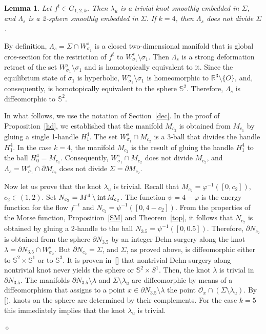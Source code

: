 \documentclass[%
 aip,
 amsmath,amssymb,
preprint,%
]{revtex4-1}
\newtheorem{lemma}{Lemma}[section]
\newenvironment{proof}{{\bf Proof:}}
{\hfill $\diamond$\medskip}
\begin{document}
\begin{lemma}\label{seq1} Let $f^t\in G_{1,2,k}$. Then $\lambda_u$ is a trivial knot smoothly embedded in $\Sigma$, and $\Lambda_s$ is a 2-sphere smoothly embedded in $\Sigma$. If $k=4$, then $\Lambda_s$ does not divide $\Sigma$.
\end{lemma}
\begin{proof} By definition, $\Lambda_s=\Sigma\cap W^s_{\sigma_1}$ is a closed two-dimensional manifold that is global cros-section for the restriction of $f^t$ to $W^s_{\sigma_1}\setminus \sigma_1$. Then  $\Lambda_s$ is a strong deformation retract of the set $W^s_{\sigma_1}\setminus \sigma_1$ and is homotopically  equivalent to it. Since the equilibrium state of $\sigma_1$ is hyperbolic, $W^s_{\sigma_1}\setminus \sigma_1$ is homeomorphic to $\mathbb R^3\setminus \{O\}$, and, consequently,  is homotopically equivalent to the sphere $\mathbb S^2$. Therefore, $\Lambda_s$ is diffeomorphic to $\mathbb S^2$.

In what follows, we use the notation of Section~\ref{dec}. In the proof of Proposition~\ref{hd}, we established that the manifold $M_{c_2}$ is obtained from $M_{c_1}$ by gluing a single 1-handle $H^4_1$. The set $W^s_{\sigma_1}\cap M_{c_2}$ is a 3-ball that divides the handle $H^4_1$. In the case $k=4$, the manifold $M_{c_2}$ is the result of gluing the handle $H^4_1$ to the ball $H^4_0=M_{c_1}$. Consequently, $W^s_{\sigma_1}\cap M_{c_2}$ does not divide $M_{c_2}$, and $\Lambda_s=W^s_{\sigma_1}\cap \partial M_{c_2}$ does not divide $\Sigma=\partial M_{c_2}$.

Now let us  prove that the knot $\lambda_u$ is trivial. Recall that $M_{c_2}=\varphi^{-1}([0,c_2])$, $c_2\in (1,2)$. Set $N_{c_2}=M^4\setminus {\rm int}\,M_{c_2}$.
The function $\psi=4-\varphi$ is the energy function for the flow $f^{-t}$ and $N_{c_2}=\psi^{-1}([0,4-c_2])$. From the properties of the Morse function, Proposition~\ref{SM} and Theorem~\ref{top}, it follows that $N_{c_2}$ is obtained by gluing a 2-handle to the ball $N_{3.5}=\psi^{-1}([0,0.5])$. Therefore, $\partial N_{c_2}$ is obtained from the sphere $\partial N_{3.5}$ by an  integer Dehn  surgery along the knot $\lambda=\partial N_{3.5}\cap W^s_{\sigma_2}$. But $\partial N_{c_2}=\Sigma$, and $\Sigma$, as proved above, is diffeomorphic either to $\mathbb S^2\times \mathbb S^1$ or to $\mathbb S^3$. It is proven in~[] that nontrivial Dehn surgery along nontrivial knot never yields the   sphere or  $\mathbb S^2\times S^1$. Then, the knot $\lambda$ is trivial in $\partial N_{3.5}$. The manifolds $\partial N_{3.5}\setminus \lambda$ and $\Sigma\setminus \lambda_u$ are diffeomorphic by means of a  diffeomorphism that assigns to a point $x\in \partial N_{3.5}\setminus \lambda$ the  point $\mathcal O_x\cap (\Sigma\setminus \lambda_u)$. By [), knots on  the sphere are determined by their complements.  For the case $k=5$ this immediately implies that  the knot $\lambda_u$ is trivial.


\end{proof}
\end{document}
